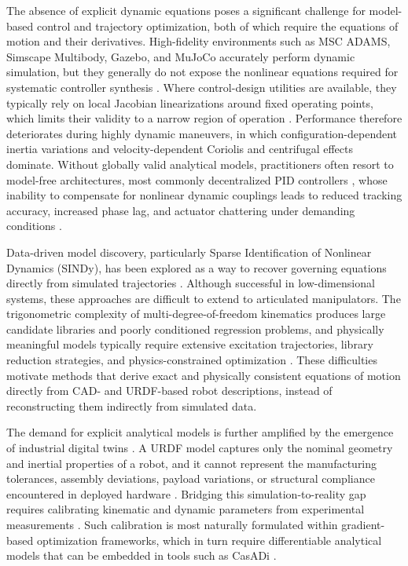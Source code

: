 \documentclass[fleqn,10pt]{article}
\begin{document}
The absence of explicit dynamic equations poses a significant challenge for model-based control and trajectory optimization, both of which require the equations of motion and their derivatives. High-fidelity environments such as MSC ADAMS, Simscape Multibody, Gazebo, and MuJoCo accurately perform dynamic simulation, but they generally do not expose the nonlinear equations required for systematic controller synthesis \cite{omar2022framework, asker2024physics}. Where control-design utilities are available, they typically rely on local Jacobian linearizations around fixed operating points, which limits their validity to a narrow region of operation \cite{omar2022framework, asker2024physics}. Performance therefore deteriorates during highly dynamic maneuvers, in which configuration-dependent inertia variations and velocity-dependent Coriolis and centrifugal effects dominate. Without globally valid analytical models, practitioners often resort to model-free architectures, most commonly decentralized PID controllers \cite{azeez2023optimization}, whose inability to compensate for nonlinear dynamic couplings leads to reduced tracking accuracy, increased phase lag, and actuator chattering under demanding conditions \cite{tadese2022two, sousa2019physical}.

Data-driven model discovery, particularly Sparse Identification of Nonlinear Dynamics (SINDy), has been explored as a way to recover governing equations directly from simulated trajectories \cite{omar2022framework, asker2024physics, omar2024robust, omar2025rsiel}. Although successful in low-dimensional systems, these approaches are difficult to extend to articulated manipulators. The trigonometric complexity of multi-degree-of-freedom kinematics produces large candidate libraries and poorly conditioned regression problems, and physically meaningful models typically require extensive excitation trajectories, library reduction strategies, and physics-constrained optimization \cite{omar2022framework, asker2024physics}. These difficulties motivate methods that derive exact and physically consistent equations of motion directly from CAD- and URDF-based robot descriptions, instead of reconstructing them indirectly from simulated data.

The demand for explicit analytical models is further amplified by the emergence of industrial digital twins \cite{kritzinger2018digital, iliuta2024digital, dimosthenopoulos2024digital, kocsis2024real, asr2026calibration}. A URDF model captures only the nominal geometry and inertial properties of a robot, and it cannot represent the manufacturing tolerances, assembly deviations, payload variations, or structural compliance encountered in deployed hardware \cite{tadese2022two, li2021overview}. Bridging this simulation-to-reality gap requires calibrating kinematic and dynamic parameters from experimental measurements \cite{asr2026calibration, omar2024robust}. Such calibration is most naturally formulated within gradient-based optimization frameworks, which in turn require differentiable analytical models that can be embedded in tools such as CasADi \cite{andersson2019casadi}.
\end{document}
